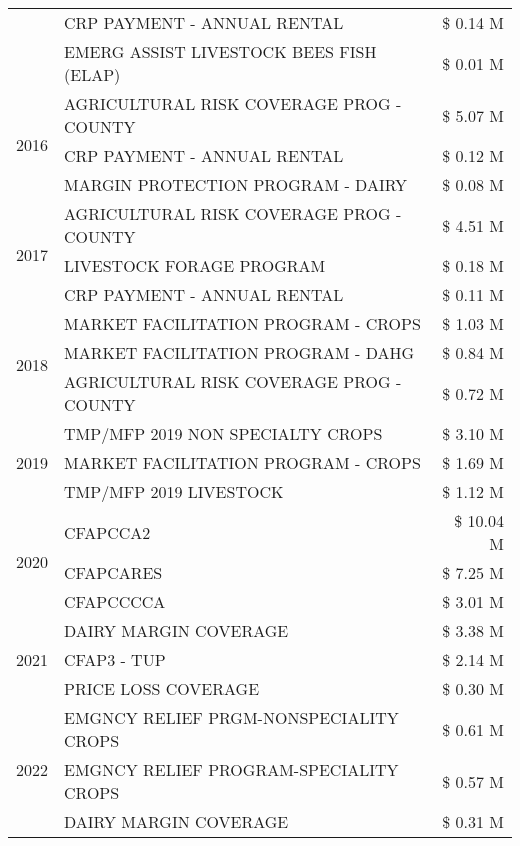 \begin{tabular}{llr}
 & CRP PAYMENT - ANNUAL RENTAL & \$ 0.14 M \\
 & EMERG ASSIST LIVESTOCK BEES FISH (ELAP) & \$ 0.01 M \\
\cline{1-3}
\multirow[t]{3}{*}{2016} & AGRICULTURAL RISK COVERAGE PROG - COUNTY & \$ 5.07 M \\
 & CRP PAYMENT - ANNUAL RENTAL & \$ 0.12 M \\
 & MARGIN PROTECTION PROGRAM - DAIRY & \$ 0.08 M \\
\cline{1-3}
\multirow[t]{3}{*}{2017} & AGRICULTURAL RISK COVERAGE PROG - COUNTY & \$ 4.51 M \\
 & LIVESTOCK FORAGE PROGRAM & \$ 0.18 M \\
 & CRP PAYMENT - ANNUAL RENTAL & \$ 0.11 M \\
\cline{1-3}
\multirow[t]{3}{*}{2018} & MARKET FACILITATION PROGRAM - CROPS & \$ 1.03 M \\
 & MARKET FACILITATION PROGRAM - DAHG & \$ 0.84 M \\
 & AGRICULTURAL RISK COVERAGE PROG - COUNTY & \$ 0.72 M \\
\cline{1-3}
\multirow[t]{3}{*}{2019} & TMP/MFP 2019 NON SPECIALTY CROPS & \$ 3.10 M \\
 & MARKET FACILITATION PROGRAM - CROPS & \$ 1.69 M \\
 & TMP/MFP 2019 LIVESTOCK & \$ 1.12 M \\
\cline{1-3}
\multirow[t]{3}{*}{2020} & CFAPCCA2 & \$ 10.04 M \\
 & CFAPCARES & \$ 7.25 M \\
 & CFAPCCCCA & \$ 3.01 M \\
\cline{1-3}
\multirow[t]{3}{*}{2021} & DAIRY MARGIN COVERAGE & \$ 3.38 M \\
 & CFAP3 - TUP & \$ 2.14 M \\
 & PRICE LOSS COVERAGE & \$ 0.30 M \\
\cline{1-3}
\multirow[t]{3}{*}{2022} & EMGNCY RELIEF PRGM-NONSPECIALITY CROPS & \$ 0.61 M \\
 & EMGNCY RELIEF PROGRAM-SPECIALITY CROPS & \$ 0.57 M \\
 & DAIRY MARGIN COVERAGE & \$ 0.31 M \\
\cline{1-3}
\bottomrule
\end{tabular}
